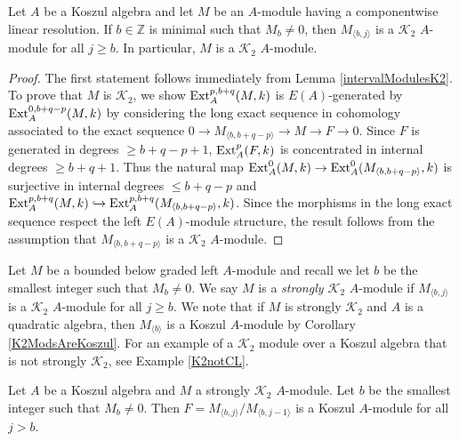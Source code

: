 \documentclass[11pt,righttag]{amsart}
\begin{document}
\begin{prop} 
\label{CLimpliesK2}
Let $A$ be a Koszul algebra and let $M$ be an $A$-module having a componentwise linear resolution. If $b\in{{\mathbb Z}}$ is minimal such that $M_b\neq 0$, then $M_{{\langle} b,j{\rangle}}$ is a ${{\mathcal K}}_2$ $A$-module for all $j\ge b$. In particular, $M$ is a ${{\mathcal K}}_2$ $A$-module.
\end{prop}

\begin{proof}
The first statement follows immediately from Lemma \ref{intervalModulesK2}. To prove that $M$ is ${{\mathcal K}}_2$, we show  ${\hbox{{\rm Ext}}}_A^{p,b+q}(M,k)$ is $E(A)$-generated by ${\hbox{{\rm Ext}}}_A^{0,b+q-p}(M,k)$ by considering the long exact sequence in cohomology associated to the exact sequence $0\rightarrow M_{{\langle} b,b+q-p{\rangle}}\rightarrow M\rightarrow F\rightarrow 0$.
Since $F$ is generated in degrees $\ge b+q-p+1$, ${\hbox{{\rm Ext}}}_A^p(F,k)$ is concentrated in internal degrees $\ge b+q+1$. Thus the natural map
${\hbox{{\rm Ext}}}_A^0(M,k)\rightarrow {\hbox{{\rm Ext}}}_A^0(M_{{\langle} b,b+q-p{\rangle}}, k)$ is surjective in internal degrees $\le b+q-p$ and
${\hbox{{\rm Ext}}}_A^{p,b+q}(M,k)\hookrightarrow {\hbox{{\rm Ext}}}_A^{p,b+q}(M_{{\langle} b,b+q-p{\rangle}},k)$. Since the morphisms in the long exact sequence respect the left $E(A)$-module structure, the result follows from the assumption that $M_{{\langle} b, b+q-p{\rangle}}$ is a ${{\mathcal K}}_2$ $A$-module.

\end{proof}

Let $M$ be a bounded below graded left $A$-module and recall we let $b$ be the smallest integer such that $M_b\neq 0$. We say $M$ is  a \emph{strongly ${{\mathcal K}}_2$} $A$-module if $M_{{\langle} b,j{\rangle}}$ is a ${{\mathcal K}}_2$ $A$-module for all $j\ge b$. We note that if $M$ is strongly ${{\mathcal K}}_2$ and $A$ is a quadratic algebra, then $M_{{\langle} b{\rangle}}$ is a Koszul $A$-module by Corollary \ref{K2ModsAreKoszul}. For an example of a ${{\mathcal K}}_2$ module over a Koszul algebra that is not strongly ${{\mathcal K}}_2$, see Example \ref{K2notCL}.

\begin{lemma}
\label{stronglyK2FactorMod}
Let $A$ be a Koszul algebra and $M$ a strongly ${{\mathcal K}}_2$ $A$-module. Let $b$ be the smallest integer such that $M_b\neq 0$. Then $F=M_{{\langle} b,j{\rangle}}/M_{{\langle} b,j-1{\rangle}}$ is a Koszul $A$-module for all $j>b$.
\end{lemma}
\end{document}
